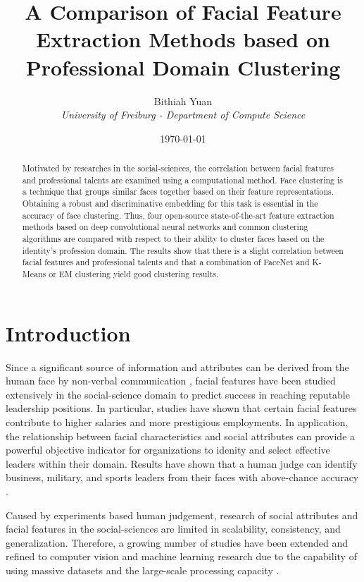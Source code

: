 \documentclass[12pt,english]{article}
\title{A Comparison of Facial Feature Extraction Methods based on Professional Domain Clustering}
\author{Bithiah Yuan \\ \textit{University of Freiburg - Department of Compute Science}}
\date{\normalsize \today}
\begin{document}
\maketitle

\begin{abstract}

Motivated by researches in the social-sciences, the correlation between facial features and professional talents are examined using a computational method. Face clustering is a technique that groups similar faces together based on their feature representations. Obtaining a robust and discriminative embedding for this task is essential in the accuracy of face clustering. Thus, four open-source state-of-the-art feature extraction methods based on deep convolutional neural networks and common clustering algorithms are compared with respect to their ability to cluster faces based on the identity's profession domain. The results show that there is a slight correlation between facial features and professional talents and that a combination of FaceNet and K-Means or EM clustering yield good clustering results.
\end{abstract}

\section{Introduction}
\label{sec:introduction}

\quad 
Since a significant source of information and attributes can be derived from the human face by non-verbal communication \cite{joo}, facial features have been studied extensively in the social-science domain to predict success in reaching reputable leadership positions. In particular, studies have shown that certain facial features contribute to higher salaries and more prestigious employments. In application, the relationship between facial characteristics and social attributes can provide a powerful objective indicator for organizations to idenity and select effective leaders within their domain. Results have shown that a human judge can identify business, military, and sports leaders from their faces with above-chance accuracy \cite{olivola}. %

Caused by experiments based human judgement, research of social attributes and facial features in the social-sciences are limited in scalability, consistency, and generalization. Therefore, a growing number of studies have been extended and refined to computer vision and machine learning research due to the capability of using massive datasets and the large-scale processing capacity \cite{joo}.
\end{document}
